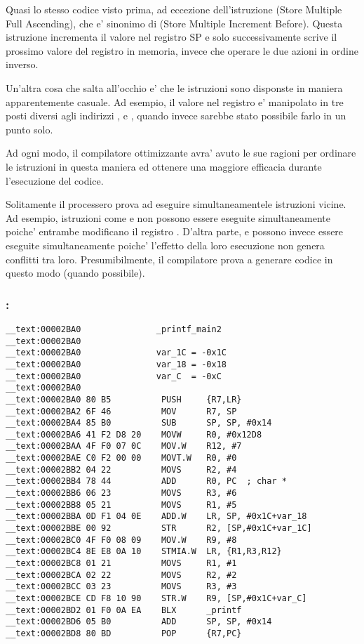 Quasi lo stesso codice visto prima, ad eccezione dell'istruzione  (Store Multiple Full Ascending),
che e' sinonimo di  (Store Multiple Increment Before). 
Questa istruzione incrementa il valore nel registro \ac{SP} e solo successivamente scrive il prossimo valore del registro in memoria, invece che operare le due azioni in ordine inverso.

Un'altra cosa che salta all'occhio e' che le istruzioni sono disponste in maniera apparentemente casuale.
Ad esempio, il valore nel registro  e' manipolato in tre posti diversi
agli indirizzi ,  e , quando invece sarebbe stato possibile farlo in un punto solo.

Ad ogni modo, il compilatore ottimizzante avra' avuto le sue ragioni per ordinare le istruzioni in questa maniera ed ottenere una maggiore efficacia durante l'esecuzione del codice.

Solitamente il processero prova ad eseguire simultaneamentele istruzioni vicine.
Ad esempio, istruzioni come  e
 non possono essere eseguite simultaneamente poiche' entrambe modificano il registro . 
D'altra parte,  e  
possono invece essere eseguite simultaneamente poiche' l'effetto della loro esecuzione non genera conflitti tra loro.
Presumibilmente, il compilatore prova a generare codice in questo modo (quando possibile).
 
\subsubsection{\OptimizingXcodeIV: \ThumbTwoMode}

\begin{lstlisting}
__text:00002BA0               _printf_main2
__text:00002BA0
__text:00002BA0               var_1C = -0x1C
__text:00002BA0               var_18 = -0x18
__text:00002BA0               var_C  = -0xC
__text:00002BA0
__text:00002BA0 80 B5          PUSH     {R7,LR}
__text:00002BA2 6F 46          MOV      R7, SP
__text:00002BA4 85 B0          SUB      SP, SP, #0x14
__text:00002BA6 41 F2 D8 20    MOVW     R0, #0x12D8
__text:00002BAA 4F F0 07 0C    MOV.W    R12, #7
__text:00002BAE C0 F2 00 00    MOVT.W   R0, #0
__text:00002BB2 04 22          MOVS     R2, #4
__text:00002BB4 78 44          ADD      R0, PC  ; char *
__text:00002BB6 06 23          MOVS     R3, #6
__text:00002BB8 05 21          MOVS     R1, #5
__text:00002BBA 0D F1 04 0E    ADD.W    LR, SP, #0x1C+var_18
__text:00002BBE 00 92          STR      R2, [SP,#0x1C+var_1C]
__text:00002BC0 4F F0 08 09    MOV.W    R9, #8
__text:00002BC4 8E E8 0A 10    STMIA.W  LR, {R1,R3,R12}
__text:00002BC8 01 21          MOVS     R1, #1
__text:00002BCA 02 22          MOVS     R2, #2
__text:00002BCC 03 23          MOVS     R3, #3
__text:00002BCE CD F8 10 90    STR.W    R9, [SP,#0x1C+var_C]
__text:00002BD2 01 F0 0A EA    BLX      _printf
__text:00002BD6 05 B0          ADD      SP, SP, #0x14
__text:00002BD8 80 BD          POP      {R7,PC}
\end{lstlisting}

